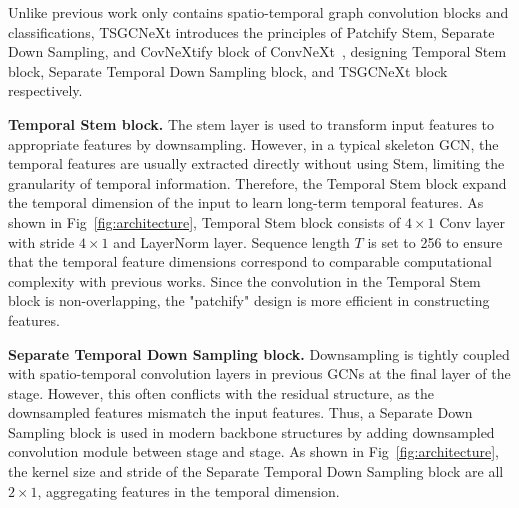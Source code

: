 \documentclass[10pt,twocolumn,letterpaper]{article}
\begin{document}
Unlike previous work only contains spatio-temporal graph convolution blocks and classifications, TSGCNeXt introduces the principles of Patchify Stem, Separate Down Sampling, and CovNeXtify block of ConvNeXt~\cite{liu2022convnet}, designing Temporal Stem block, Separate Temporal Down Sampling block, and TSGCNeXt block respectively.

\noindent\textbf{Temporal Stem block.} The stem layer is used to transform input features to appropriate features by downsampling. However, in a typical skeleton GCN, the temporal features are usually extracted directly without using Stem, limiting the granularity of temporal information. Therefore, the Temporal Stem block expand the temporal dimension of the input to learn long-term temporal features. As shown in Fig~\ref{fig:architecture}, Temporal Stem block consists of $4\times 1$ Conv layer with stride $4\times 1$ and LayerNorm layer. Sequence length $T$ is set to 256 to ensure that the temporal feature dimensions correspond to comparable computational complexity with previous works. Since the convolution in the Temporal Stem block is non-overlapping, the "patchify" design is more efficient in constructing features.

\noindent\textbf{Separate Temporal Down Sampling block.} Downsampling is tightly coupled with spatio-temporal convolution layers in previous GCNs at the final layer of the stage. However, this often conflicts with the residual structure, as the downsampled features mismatch the input features. Thus, a Separate Down Sampling block is used in modern backbone structures by adding downsampled convolution module between stage and stage. As shown in Fig~\ref{fig:architecture}, the kernel size and stride of the Separate Temporal Down Sampling block are all $2\times 1$, aggregating features in the temporal dimension.
\end{document}
